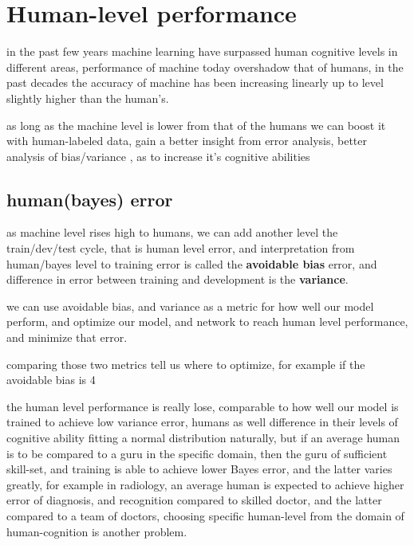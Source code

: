 \documentclass[4apaper,12pt]{book}
\begin{document}
  \section{Human-level performance}
  \begin{description}
  \item in the past few years machine learning have surpassed human cognitive levels in different areas, performance of machine today overshadow that of humans, in the past decades the accuracy of machine has been increasing linearly up to level slightly higher than the human's.
  \item as long as the machine level is lower from that of the humans we can boost it with human-labeled data, gain a better insight from error analysis, better analysis of bias/variance , as to increase it's cognitive abilities
    \subsection{human(bayes) error}
  \item as machine level rises high to humans, we can add another level the train/dev/test cycle, that is human level error, and interpretation from human/bayes level to training error is called the \textbf{avoidable bias} error, and difference in error between training and development is the \textbf{variance}.
  \item we can use avoidable bias, and variance as a metric for how well our model perform, and optimize our model, and network to reach human level performance, and minimize that error.
  \item comparing those two metrics tell us where to optimize, for example if the avoidable bias is 4%
    \item the human level performance is really lose, comparable to how well our model is trained to achieve low variance error, humans as well difference in their levels of cognitive ability fitting a normal distribution naturally, but if an average human is to be compared to a guru in the specific domain, then the guru of sufficient skill-set, and training is able to achieve lower Bayes error, and the latter varies greatly, for example in radiology, an average human is expected to achieve higher error of diagnosis, and recognition  compared to skilled doctor, and the latter compared to a team of doctors, choosing specific human-level from the domain of human-cognition is another problem.
  \end{description}
\end{document}
